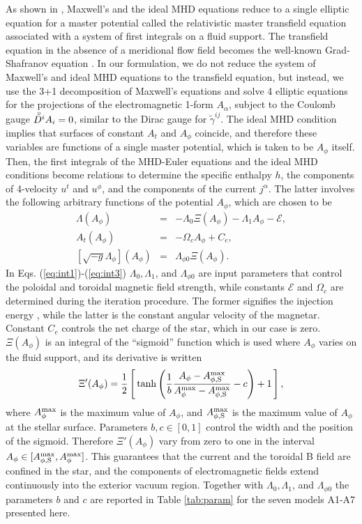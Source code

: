 \documentclass[twocolumn,superscriptaddress,showpacs,prl,aps,amsmath,amssymb,nofootinbib]{revtex4-1}
\newcommand{\GA}{\alpha}
\newcommand{\GG}{\gamma}
\newcommand{\GP}{\phi}
\newcommand{\be}{\begin{equation}}
\newcommand{\ee}{\end{equation}}
\newcommand{\TUU}[3]{\tilde{#1}^{#2 #3}}
\newcommand{\zD}{{\raise1.0ex\hbox{${}^{\ \circ}$}}\!\!\!\!\!D}
\begin{document}
As shown in \cite{Gourgoulhon:2011gz}, Maxwell's and the ideal MHD equations
reduce to a single elliptic equation for a master potential called the
relativistic master transfield equation associated with a system of first
integrals on a fluid support.  The transfield equation in the absence of a
meridional flow field becomes the well-known Grad-Shafranov equation
\cite{Shafranov1958,Grad1960,Shafranov1966}.  In our formulation, we do not
reduce the system of Maxwell's and ideal MHD equations to the transfield
equation, but instead, we use the 3+1 decomposition of Maxwell's equations and
solve 4 elliptic equations for the projections of the electromagnetic 1-form
$A_\GA$, subject to the Coulomb gauge $\zD^i A_i=0$, similar to the Dirac gauge
for $\TUU{\GG}{i}{j}$. The ideal MHD condition implies that surfaces of
constant $A_t$ and $A_\GP$ coincide, and therefore these variables are
functions of a single master potential, which is taken to be $A_\GP$ itself.
Then, the first integrals of the MHD-Euler equations and the ideal MHD
conditions become relations to determine the specific enthalpy $h$, the
components of 4-velocity $u^t$ and $u^\phi$, and the components of the current
$j^\alpha$. The latter involves the following arbitrary functions of the
potential $A_\phi$, which are chosen to be
\begin{eqnarray}
\Lambda(A_\GP) & = & -\Lambda_0 \Xi(A_\GP) -\Lambda_1 A_\GP - \mathcal{E},  \label{eq:int1} \\
A_t(A_\GP)  & = & -\Omega_c A_\GP + C_e,  \label{eq:int2} \\
{[\sqrt{-g} \Lambda_\GP]} (A_\GP) & = & \Lambda_{\GP 0} \Xi(A_\GP). \label{eq:int3} 
\end{eqnarray}
In Eqs. (\ref{eq:int1})-(\ref{eq:int3}) 
$\Lambda_0, \Lambda_1$, and $\Lambda_{\GP 0}$ are input parameters that 
control the poloidal and toroidal magnetic field strength, while constants 
$\mathcal{E}$ and $\Omega_c$ are determined during the iteration procedure. 
The former signifies the injection energy \cite{Friedman2012}, while 
the latter is the constant angular velocity of the magnetar. 
Constant $C_e$ controls the net charge of the star, which in our case is zero. $\Xi(A_\GP)$ is 
an integral of the ``sigmoid'' function \cite{Uryu:2019ckz} which is used where 
$A_\GP$ varies on the fluid support, and  
its derivative is written
\be
\Xi'(A_\phi)
= \frac12\left[\,\tanh\left(\frac1{b}
\frac{A_\phi-A_{\phi, \rm S}^{\rm max}}{A_\phi^{\rm max} - A_{\phi, \rm S}^{\rm max}}
-c\right)+1\,\right],  
\label{eq:xi}
\ee
where $A_\phi^{\rm max}$ is the maximum value of $A_\phi$, and $A_{\phi, \rm
S}^{\rm max}$ is the maximum value of $A_\phi$ at the stellar surface.
Parameters $b,c \in [0,1]$ control the width and the position of the sigmoid.
Therefore $\Xi'(A_\phi)$ vary from zero to one in the interval $A_\phi \in
[A_{\phi, \rm S}^{\rm max}, A_\phi^{\rm max}]$.  This guarantees that the
current and the toroidal B field are confined in the star, and the components
of electromagnetic fields extend continuously into the exterior vacuum region.
Together with $\Lambda_0, \Lambda_1$, and $\Lambda_{\GP 0}$ the parameters $b$
and $c$ are reported in Table \ref{tab:param} for the seven models A1-A7
presented here.  
\end{document}
